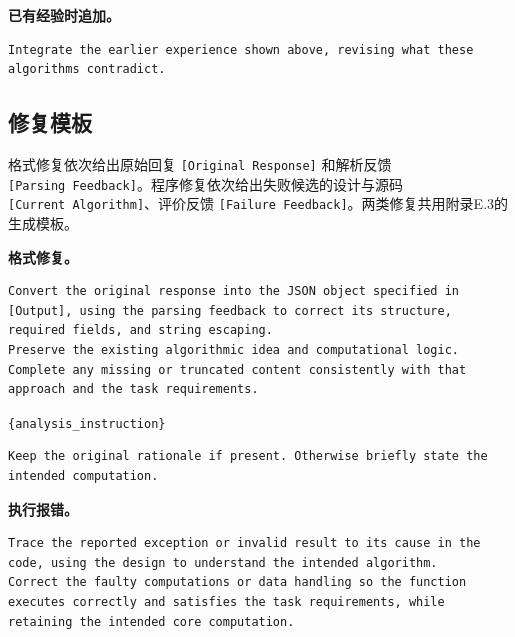 \documentclass{article}
\begin{document}
\noindent\begin{minipage}{\linewidth}
\textbf{已有经验时追加。}

\begin{verbatim}
Integrate the earlier experience shown above, revising what these algorithms contradict.
\end{verbatim}
\end{minipage}\par

\subsection{修复模板}\label{ux4feeux590dux6a21ux677f}

格式修复依次给出原始回复 \texttt{{[}Original\ Response{]}} 和解析反馈 \texttt{{[}Parsing\ Feedback{]}}。程序修复依次给出失败候选的设计与源码 \texttt{{[}Current\ Algorithm{]}}、评价反馈 \texttt{{[}Failure\ Feedback{]}}。两类修复共用附录E.3的生成模板。

\noindent\begin{minipage}{\linewidth}
\textbf{格式修复。}

\begin{verbatim}
Convert the original response into the JSON object specified in [Output], using the parsing feedback to correct its structure, required fields, and string escaping.
Preserve the existing algorithmic idea and computational logic.
Complete any missing or truncated content consistently with that approach and the task requirements.
\end{verbatim}
\end{minipage}\par

\noindent\begin{minipage}{\linewidth}
\texttt{\{analysis\_instruction\}}

\begin{verbatim}
Keep the original rationale if present. Otherwise briefly state the intended computation.
\end{verbatim}
\end{minipage}\par

\noindent\begin{minipage}{\linewidth}
\textbf{执行报错。}

\begin{verbatim}
Trace the reported exception or invalid result to its cause in the code, using the design to understand the intended algorithm.
Correct the faulty computations or data handling so the function executes correctly and satisfies the task requirements, while retaining the intended core computation.
\end{verbatim}
\end{minipage}\par
\end{document}
